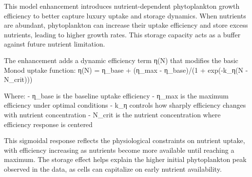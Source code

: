 This model enhancement introduces nutrient-dependent phytoplankton growth efficiency to better capture luxury uptake and storage dynamics. When nutrients are abundant, phytoplankton can increase their uptake efficiency and store excess nutrients, leading to higher growth rates. This storage capacity acts as a buffer against future nutrient limitation.

The enhancement adds a dynamic efficiency term η(N) that modifies the basic Monod uptake function:
η(N) = η_base + (η_max - η_base)/(1 + exp(-k_η(N - N_crit)))

Where:
- η_base is the baseline uptake efficiency
- η_max is the maximum efficiency under optimal conditions  
- k_η controls how sharply efficiency changes with nutrient concentration
- N_crit is the nutrient concentration where efficiency response is centered

This sigmoidal response reflects the physiological constraints on nutrient uptake, with efficiency increasing as nutrients become more available until reaching a maximum. The storage effect helps explain the higher initial phytoplankton peak observed in the data, as cells can capitalize on early nutrient availability.
